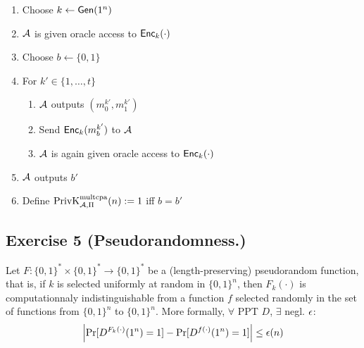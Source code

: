 \begin{solution}
\begin{enumerate}
      \begin{enumerate}
        \item Choose $k \leftarrow \operatorname{\mathsf{Gen}}(1^n)$
        \item $\mathcal{A}$ is given oracle access to $\operatorname{\mathsf{Enc}}_k(\cdot)$
        \item Choose $b \leftarrow \{0,1\}$
        \item For $k' \in \{1, \ldots, t\}$
          \begin{enumerate}
            \item $\mathcal{A}$ outputs $(m_0^{k'}, m_1^{k'})$
            \item Send $\operatorname{\mathsf{Enc}}_k(m_b^{k'})$ to $\mathcal{A}$
            \item $\mathcal{A}$ is again given oracle access to $\operatorname{\mathsf{Enc}}_k(\cdot)$
          \end{enumerate}
        \item $\mathcal{A}$ outputs $b'$
        \item Define $\operatorname{PrivK}^{\text{multcpa}}_{\mathcal{A},\Pi}(n) := 1$ iff $b = b'$
      \end{enumerate} 
  \end{enumerate}
\end{solution}


\subsection{Exercise 5 (Pseudorandomness.)}
Let $F: \{0,1\}^* \times \{0,1\}^* \rightarrow \{0,1\}^*$ be a
(length-preserving) pseudorandom function, that is, if $k$ is selected
uniformly at random in $\{0,1\}^n$, then $F_k(\cdot)$ is
computationnaly indistinguishable from a function $f$ selected randomly in the set of
functions from $\{0,1\}^n$ to $\{0,1\}^n$. More formally, $\forall$ PPT $D$, $\exists$ negl. $\epsilon$:
$$\left|\Pr[D^{F_k(\cdot)}(1^n)=1]-\Pr[D^{f(\cdot)}(1^n)=1]\right|\leq\epsilon(n)$$

